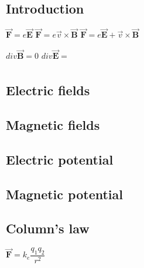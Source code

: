 
\subsection{Introduction}

\(\overrightarrow{\mathbf F} = e\overrightarrow{\mathbf E}\)
\(\overrightarrow{\mathbf F} = e\overrightarrow{v}\times \overrightarrow{\mathbf B}\)
\(\overrightarrow{\mathbf F} = e{\overrightarrow{\mathbf E}+\overrightarrow{v}\times \overrightarrow{\mathbf B}}\)

\(div \overrightarrow{\mathbf B}=0\)
\(div \overrightarrow{\mathbf E}=\dfrac{}{}\)

\subsection{Electric fields}

\subsection{Magnetic fields}

\subsection{Electric potential}

\subsection{Magnetic potential}

\subsection{Column's law}

\(\overrightarrow{\mathbf F}=k_e\dfrac{q_1q_2}{r^2}\)



